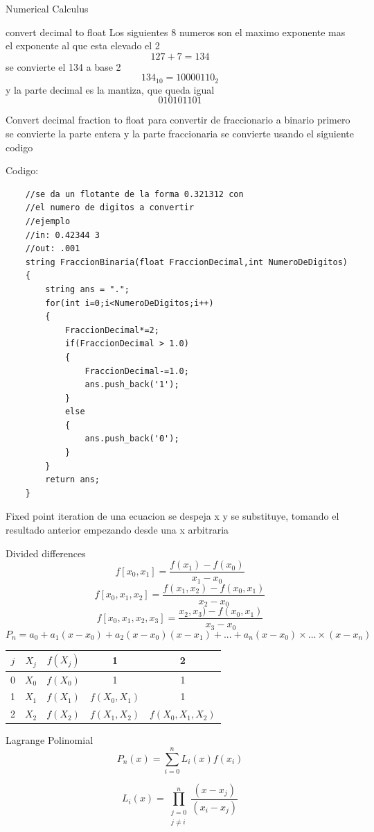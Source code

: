 \begin{section}{Numerical Calculus}
\begin{subsection}{convert decimal to float}
Los siguientes 8 numeros son el maximo exponente mas el exponente al que esta
elevado el 2 $$127+7 = 134$$ se convierte el 134 a base 2
$$134_10 = 10000110_2$$ y la parte decimal es la mantiza, que queda igual
$$010101101$$

\newpage

\end{subsection}
\begin{subsection}{Convert decimal fraction to float}
para convertir de fraccionario a binario primero se convierte la parte entera y la parte fraccionaria se convierte usando el siguiente codigo

Codigo:

\begin{verbatim}
	//se da un flotante de la forma 0.321312 con 
	//el numero de digitos a convertir
	//ejemplo
	//in: 0.42344 3
	//out: .001
	string FraccionBinaria(float FraccionDecimal,int NumeroDeDigitos)
	{
		string ans = ".";
		for(int i=0;i<NumeroDeDigitos;i++)
		{
			FraccionDecimal*=2;
			if(FraccionDecimal > 1.0)
			{
				FraccionDecimal-=1.0;
				ans.push_back('1');
			}
			else
			{
				ans.push_back('0');
			}
		}
		return ans;
	}
\end{verbatim}

\end{subsection}
\begin{subsection}{Fixed point iteration}
de una ecuacion se despeja x y se substituye, tomando el resultado anterior
empezando desde una x arbitraria

\end{subsection}
\newpage
\begin{subsection}{Divided differences}
$$f[x_0,x_1] = \frac{f(x_1)-f(x_0)}{x_1-x_0}$$
$$f[x_0,x_1,x_2] = \frac{f(x_1,x_2)-f(x_0,x_1)}{x_2-x_0}$$
$$ f[x_0,x_1,x_2,x_3] = \frac{x_2,x_3) - f(x_0,x_1)}{x_3-x_0}$$
$$P_n = a_0 + a_1(x-x_0) + a_2(x-x_0)(x-x_1) + ... + a_n(x-x_0) \times ... \times (x-x_n)$$

\begin{center}
 \begin{tabular}{|c c c c c|} 
 \hline
	 $j$ & $X_j$ & $f(X_j)$ & 1 & 2  \\ [0.5ex] 
 \hline\hline
	 0 & $X_0$ & $f(X_0)$ & 1 &  1 \\
 \hline
	 1 & $X_1$ & $f(X_1)$ & $f(X_0,X_1)$ & 1 \\
 \hline
	 2 & $X_2$ & $f(X_2)$ & $f(X_1,X_2)$ & $f(X_0,X_1,X_2)$ \\
 \hline
\end{tabular}
\end{center}


\end{subsection}
\begin{subsection}{Lagrange Polinomial}
$$P_n(x) = \sum_{i=0}^{n} L_i(x)f(x_i)$$

$$
L_i(x) = \prod_{\substack{j=0 \\
	j \neq i}}^{n}
	\frac{(x-x_j)}{(x_i-x_j)}
$$

\end{subsection}

\end{section}





